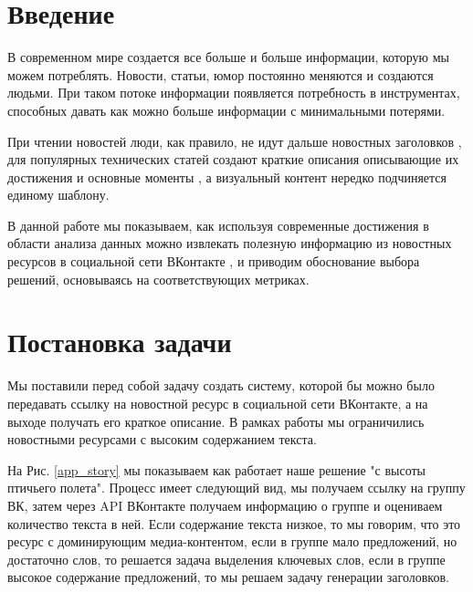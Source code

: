 \documentclass[14pt]{matmex-diploma-custom}
\begin{document}

\section*{Введение}
В современном мире создается все больше и больше информации, которую мы можем потреблять.
Новости, статьи, юмор постоянно меняются и создаются людьми. При таком потоке информации
появляется потребность в инструментах, способных давать как можно больше информации
с минимальными потерями.

При чтении новостей люди, как правило, не идут дальше новостных заголовков \cite{jaysondemers2016},
для популярных технических статей создают краткие описания описывающие их достижения
и основные моменты \cite{tldr_arxiv2019, articleessence2019}, а визуальный контент нередко подчиняется единому шаблону.

В данной работе мы показываем, как используя современные достижения в области анализа
данных можно извлекать полезную информацию из новостных ресурсов в социальной сети ВКонтакте \cite{vk2019},
и приводим обоснование выбора решений, основываясь на соответствующих метриках.

\section{Постановка задачи}
Мы поставили перед собой задачу создать систему, которой бы можно было передавать ссылку на новостной ресурс в социальной сети ВКонтакте, а на выходе получать его краткое описание. В рамках работы мы ограничились новостными ресурсами с высоким содержанием текста.

На Рис. \ref{app_story} мы показываем как работает наше решение "с высоты птичьего полета". Процесс имеет следующий вид, мы получаем ссылку на группу ВК, затем через API ВКонтакте получаем информацию о группе и оцениваем количество текста в ней. Если содержание текста низкое, то мы говорим, что это ресурс с доминирующим медиа-контентом, если в группе мало предложений, но достаточно слов, то решается задача выделения ключевых слов, если в группе высокое содержание предложений, то мы решаем задачу генерации заголовков.
\end{document}
